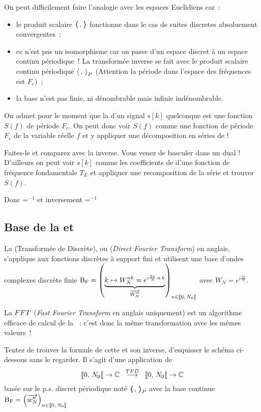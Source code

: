 On peut difficilement faire l'analogie avec les espaces Euclidiens  car~:
\begin{itemize}
   \item le produit scalaire $\langle\!\!\langle\,,\,\rangle\!\!\rangle$ fonctionne dans le cas de suites discretes absoluement convergentes~;
 \item ce n'est pas un isomorphisme car on passe d'un espace discret à un espace continu périodique~! La transformée inverse se fait avec le produit scalaire continu périodique $\langle\,,\,{\rangle}_P$ (Attention la période dans l'espace des fréquences est $F_e$)~;
\item la base n'est pas finie, ni dénombrable  mais infinie indénombrable.
\end{itemize}


\begin{exercice}
  On admet pour le moment que la \TFSD{} d'un signal $s[k]$ quelconque est une fonction $S(f)$ de période $F_e$. On peut donc voir $S(f)$ comme une fonction de période $F_e$ de la variable réelle $f$ et y appliquer une décomposition en séries de \Fourier{}!

  Faites-le et comparez avec la \TFSD{} inverse. Vous venez de basculer dans un dual ! D'ailleurs on peut voir $s[k]$ comme les coefficients de \Fourier{} d'une fonction de fréquence fondamentale $T_E$ et appliquer une recomposition de la série et trouver $S(f)$.

  Donc \TFSD{}=\sdf{}$^{-1}$ et inversement \sdf{}=\TFSD{}$^{-1}$
\end{exercice}

\subsection{Base de la \TFD{} et  \FFT{}}

La \TFD{} (Transformée de \Fourier{} Discrète), ou \DFT{} (\emph{Direct Fourier Transform}) en anglais, s'applique aux fonctions discrètes à support fini et utilisent une base d'ondes complexes discrète finie $\Bf=\p{\caCest{k\mapsto W_N^{nk}=e^{i \frac{2 \pi}{N}\,n\,k}}{\vec{W_N^{n}}}}_{n\in\SN0}$ avec $W_N=e^{i \frac{2 \pi}{N}}$.

La $FFT{}$ (\emph{Fast Fourier Transform} en anglais uniquement) est un algorithme efficace de calcul de la \TFD{}~: c'est donc la même transformation avec les mêmes valeurs~!

\begin{exercice}
Tentez de trouver la formule de cette \TFD{}  et son inverse, d'esquisser le schéma ci-dessous sans le regarder. Il s'agit d'une application de $$\SN0\rightarrow\C\;\;\operateur{\TFD}\;\;\SN0\rightarrow\C$$ basée sur le p.s. discret périodique noté $\langle\!\!\langle\,,\,{\rangle\!\!\rangle}_P$ avec la base continue $\Bf=\p{\vec{w_N^{n}}}_{n\in\SN0}$
\end{exercice}

